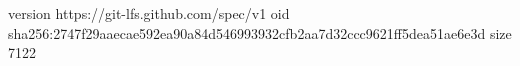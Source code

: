 version https://git-lfs.github.com/spec/v1
oid sha256:2747f29aaecae592ea90a84d546993932cfb2aa7d32ccc9621ff5dea51ae6e3d
size 7122
